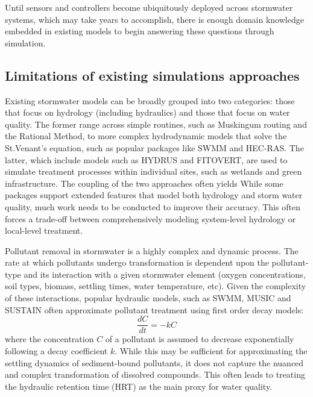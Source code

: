 Until sensors and controllers become ubiquitously deployed across stormwater systems, which may take years to accomplish, there is enough domain knowledge embedded in existing models to begin answering these questions through simulation. 


\subsection{Limitations of existing simulations approaches}
Existing stormwater models can be broadly grouped into two categories: those
that focus on hydrology (including hydraulics) and those that focus on water quality. The former range across simple routines, such as Muskingum routing\cite{Brunner1991ANetworks} and the Rational Method\cite{Chin2000Water-resourcesEngineering}, to more complex hydrodynamic models that solve the St.Venant's equation, such as popular packages like SWMM\cite{Rossman2010Storm5.1} and HEC-RAS\cite{Brunner2016HECManual}. The latter, which include models such as HYDRUS\cite{Rizzo2014ModellingHYDRUS-CWM1,Palfy2014TheData} and FITOVERT\cite{Giraldi2010FITOVERT:Wetlands},  are used to simulate treatment processes within individual sites, such as wetlands and green infrastructure. The coupling of the two approaches often yields  
While some packages support extended features that model both hydrology and
storm water quality, much work needs to be conducted to improve their
accuracy. This often forces a trade-off between
comprehensively modeling system-level hydrology or local-level treatment.


Pollutant removal in stormwater is a highly complex and dynamic process. The rate at which pollutants undergo transformation is dependent upon the pollutant-type and its interaction with a given stormwater element (oxygen concentrations, soil types, biomass, settling times, water temperature, etc). Given the complexity of these interactions, popular hydraulic models, such as SWMM, MUSIC\cite{Wong2002AConceptualisation} and SUSTAIN\cite{Lai2007SUSTAINWATERSHEDS} often approximate pollutant treatment using first order decay models\cite{Kadlec2008TreatmentWetlands}:
\begin{equation}
	\frac{dC}{dt}=-kC
\end{equation}
where the concentration $C$ of a pollutant is assumed to decrease exponentially following a decay coefficient $k$. While this may be sufficient for approximating the settling dynamics of sediment-bound pollutants, it does not capture the nuanced and complex transformation of dissolved compounds. This often leads to treating the hydraulic retention time (HRT) as the main proxy for water quality. 


